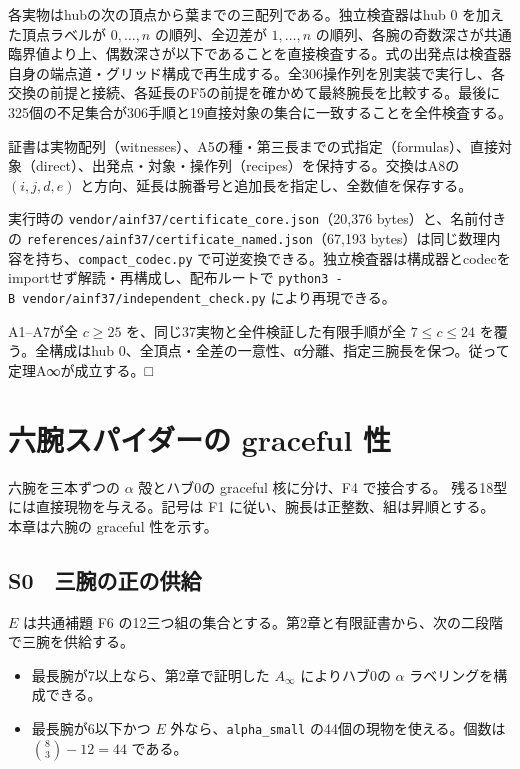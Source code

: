 \documentclass[
  10pt,
  a4paper,
]{article}
\providecommand{\tightlist}{%
  \setlength{\itemsep}{0pt}\setlength{\parskip}{0pt}}
\begin{document}
各実物はhubの次の頂点から葉までの三配列である。独立検査器はhub \(0\)
を加えた頂点ラベルが \(0,\ldots,n\) の順列、全辺差が \(1,\ldots,n\)
の順列、各腕の奇数深さが共通臨界値より上、偶数深さが以下であることを直接検査する。式の出発点は検査器自身の端点道・グリッド構成で再生成する。全306操作列を別実装で実行し、各交換の前提と接続、各延長のF5の前提を確かめて最終腕長を比較する。最後に325個の不足集合が306手順と19直接対象の集合に一致することを全件検査する。

証書は実物配列（witnesses）、A5の種・第三長までの式指定（formulas）、直接対象（direct）、出発点・対象・操作列（recipes）を保持する。交換はA8の
\((i,j,d,e)\) と方向、延長は腕番号と追加長を指定し、全数値を保存する。

実行時の \texttt{vendor/ainf37/certificate\_core.json}（20,376
bytes）と、名前付きの
\texttt{references/ainf37/certificate\_named.json}（67,193
bytes）は同じ数理内容を持ち、\texttt{compact\_codec.py}
で可逆変換できる。独立検査器は構成器とcodecをimportせず解読・再構成し、配布ルートで
\texttt{python3\ -B\ vendor/ainf37/independent\_check.py}
により再現できる。

A1--A7が全 \(c\ge25\) を、同じ37実物と全件検証した有限手順が全
\(7\le c\le24\) を覆う。全構成はhub
\(0\)、全頂点・全差の一意性、α分離、指定三腕長を保つ。従って定理A∞が成立する。□

\section{六腕スパイダーの graceful
性}\label{ux516dux8155ux30b9ux30d1ux30a4ux30c0ux30fcux306e-graceful-ux6027}

六腕を三本ずつの \(\alpha\) 殻とハブ0の graceful 核に分け、F4
で接合する。 残る18型には直接現物を与える。記号は F1
に従い、腕長は正整数、組は昇順とする。 本章は六腕の graceful 性を示す。

\subsection{S0　三腕の正の供給}\label{s0-ux4e09ux8155ux306eux6b63ux306eux4f9bux7d66}

\(E\) は共通補題 F6
の12三つ組の集合とする。第2章と有限証書から、次の二段階で三腕を供給する。

\begin{itemize}
\tightlist
\item
  最長腕が7以上なら、第2章で証明した \(A_\infty\) によりハブ0の
  \(\alpha\) ラベリングを構成できる。
\item
  最長腕が6以下かつ \(E\) 外なら、\texttt{alpha\_small}
  の44個の現物を使える。個数は \(\binom{8}{3}-12=44\) である。
\end{itemize}
\end{document}
